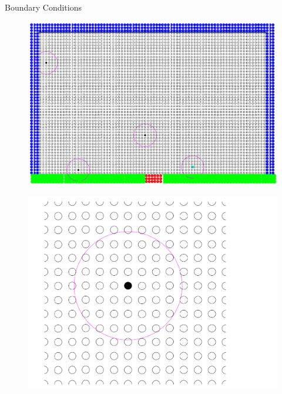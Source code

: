 \documentclass{beamer}
\begin{document}
\begin{frame}{Boundary Conditions}
\noindent
\begin{minipage}{0.69 \textwidth}
\begin{figure}
\includegraphics[width=0.99 \textwidth]{./PPT/BC_shot}
\end{figure}
\end{minipage}
\begin{minipage}{0.30 \textwidth}
\begin{figure}
\includegraphics[width=0.99 \textwidth]{./PPT/BC_real}
\end{figure}
\end{minipage}
\\
\begin{minipage}{0.325 \textwidth}
\begin{figure}

\end{figure}
\end{minipage}
\end{frame}
\end{document}

